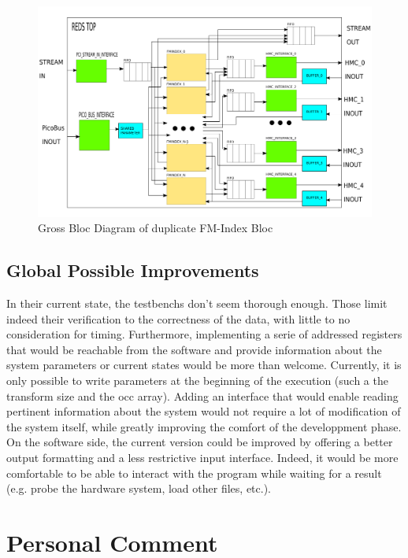 \begin{figure}[H]
    \centering
    \includegraphics [scale = 0.4]{Figures/FMINDEX_DUPL_DIAG.png}
    \caption{Gross Bloc Diagram of duplicate FM-Index Bloc}
    \label{fig:FM_FIFO}
\end{figure}

\subsection{Global Possible Improvements}

In their current state, the testbenchs don't seem thorough enough. Those limit indeed their verification to the correctness of the data, with little to no consideration for timing. Furthermore, implementing a serie of addressed registers that would be reachable from the software and provide information about the system parameters or current states would be more than welcome. Currently, it is only possible to write parameters at the beginning of the execution (such a the transform size and the occ array). Adding an interface that would enable reading pertinent information about the system would not require a lot of modification of the system itself, while greatly improving the comfort of the developpment phase. \\


On the software side, the current version could be improved by offering a better output formatting and a less restrictive input interface. Indeed, it would be more comfortable to be able to interact with the program while waiting for a result (e.g. probe the hardware system, load other files, etc.).


\section{Personal Comment}


